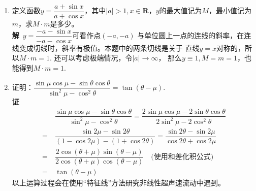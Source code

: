 \begin{enumerate}[label={【\textbf{例\thechapter.\arabic*}】},
 leftmargin=\inteval{\myenumleftmargin}pt,
 itemsep=\inteval{\myenumitempsep}pt,
 itemindent=\inteval{\myenumitemindent}pt]
\item 定义函数$ y=\dfrac{a+\sin x}{a+\cos x} $，其中$ |a|>1,x\in 
\textbf{R} $，$ y $的最大值记为$ M $，最小值记为$ m $，求$ M\cdot m $是多少。\\
\textbf{解}\ $ y=\dfrac{-a-\sin x}{-a-\cos x} $可看作点$ (-a,-a) $
与单位圆上一点的连线的斜率，在连线变成切线时，斜率有极值。本题中的两条切线是关于
直线$ y=x $对称的，所以$ M\cdot m=1 $. 还可以考虑极端情况，令$ |a|\to\infty $，
那么$ y\equiv 1,M=m=1 $，也能得到$ M\cdot m=1 $. 

\item 证明：$ \dfrac{\sin \mu\cos\mu-\sin\theta \cos\theta}
{\sin^2 \mu-\cos^2\theta}=\tan(\theta-\mu) $. \\
\textbf{证}\ 
\begin{align*}
    &\ \dfrac{\sin \mu\cos\mu-\sin\theta \cos\theta}
    {\sin^2 \mu-\cos^2\theta}
    = \dfrac{2\sin \mu\cos\mu-2\sin\theta \cos\theta}
    {2\sin^2 \mu-2\cos^2\theta}\\
    =&\ \dfrac{\sin2\mu-\sin2\theta}{(1-\cos2\mu)-(1+
        \cos2\theta)}
    = \dfrac{\sin2\theta-\sin2\mu}{\cos2\theta+
        \cos2\mu}\\
    =&\ \dfrac{2\cos(\theta+\mu)\sin(\theta-\mu)}{
        2\cos(\theta+\mu)\cos(\theta-\mu)}
    \quad \text{(使用和差化积公式)} \\
    =&\ \tan(\theta-\mu)
\end{align*}
以上运算过程会在使用“特征线”方法研究非线性超声速流动中遇到。


\end{enumerate}
